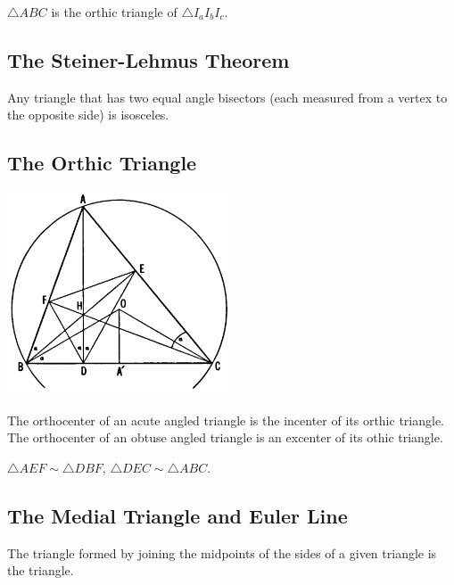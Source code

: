 \documentclass[DIV=12, a4]{scrartcl}
\begin{document}
\begin{lemma}
	$\triangle ABC$ is the orthic triangle of $\triangle I_a I_b I_c$.
\end{lemma}

\subsection{The Steiner-Lehmus Theorem}

\begin{theorem}
	Any triangle that has two equal angle bisectors (each measured from a vertex to the opposite side) is isosceles.
\end{theorem}

\subsection{The Orthic Triangle }

\begin{center}
		\includegraphics[width=0.5\textwidth]{media/1-6A}
\end{center}

\begin{theorem}
	The orthocenter of an acute angled triangle is the incenter of its orthic triangle.
	The orthocenter of an obtuse angled triangle is an excenter of its othic triangle.
\end{theorem}

\begin{lemma}
	$\triangle AEF \sim \triangle DBF$, $\triangle DEC \sim \triangle ABC$.
\end{lemma}

\subsection{The Medial Triangle and Euler Line}

\begin{definition}
	The triangle formed by joining the midpoints of the sides of a given triangle is the  triangle.
\end{definition}
\end{document}
